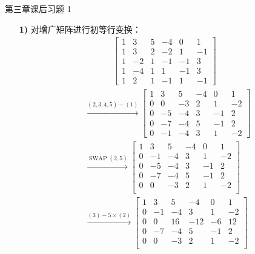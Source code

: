 \begin{problem}
	第三章课后习题 1
	\begin{solution}
		\begin{enumerate}
			\item[\textbf{1)}] 对增广矩阵进行初等行变换：
			$$
			\begin{aligned}
				\left[\begin{array}{ccccc|c}
					1 & 3 & 5 & -4 & 0 & 1 \\
					1 & 3 & 2 & -2 & 1 & -1 \\
					1 & -2 & 1 & -1 & -1 & 3 \\
					1 & -4 & 1 & 1 & -1 & 3 \\
					1 & 2 & 1 & -1 & 1 & -1
				\end{array}\right]
			\end{aligned}
			$$
			$$
			\begin{aligned}
				& \xrightarrow{(2,3,4,5) - (1)} \left[\begin{array}{ccccc|c}
					1 & 3 & 5 & -4 & 0 & 1 \\
					0 & 0 & -3 & 2 & 1 & -2 \\
					0 & -5 & -4 & 3 & -1 & 2 \\
					0 & -7 & -4 & 5 & -1 & 2 \\
					0 & -1 & -4 & 3 & 1 & -2
				\end{array}\right] \\
				& \xrightarrow{\operatorname{SWAP}(2,5)} \left[\begin{array}{ccccc|c}
					1 & 3 & 5 & -4 & 0 & 1 \\
					0 & -1 & -4 & 3 & 1 & -2 \\
					0 & -5 & -4 & 3 & -1 & 2 \\
					0 & -7 & -4 & 5 & -1 & 2 \\
					0 & 0 & -3 & 2 & 1 & -2 \\
				\end{array}\right] \\
				& \xrightarrow{(3)-5 \times (2)} \left[\begin{array}{ccccc|c}
					1 & 3 & 5 & -4 & 0 & 1 \\
					0 & -1 & -4 & 3 & 1 & -2 \\
					0 & 0 & 16 & -12 & -6 & 12 \\
					0 & -7 & -4 & 5 & -1 & 2 \\
					0 & 0 & -3 & 2 & 1 & -2 \\
				\end{array}\right] \\

\end{aligned}$$
\end{enumerate}
\end{solution}
\end{problem}
